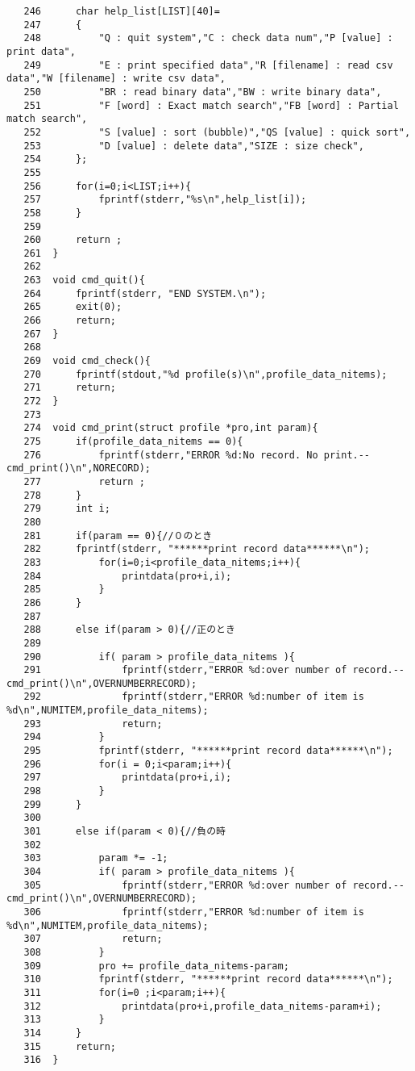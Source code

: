 \documentclass[a4j,11pt]{jarticle}
\begin{document}
{\begin{verbatim}
   246	    char help_list[LIST][40]=
   247	    {
   248	        "Q : quit system","C : check data num","P [value] : print data",
   249	        "E : print specified data","R [filename] : read csv data","W [filename] : write csv data",
   250	        "BR : read binary data","BW : write binary data",
   251	        "F [word] : Exact match search","FB [word] : Partial match search",
   252	        "S [value] : sort (bubble)","QS [value] : quick sort",
   253	        "D [value] : delete data","SIZE : size check",
   254	    };
   255	
   256	    for(i=0;i<LIST;i++){
   257	        fprintf(stderr,"%s\n",help_list[i]);
   258	    }
   259	
   260	    return ;
   261	}
   262	
   263	void cmd_quit(){
   264	    fprintf(stderr, "END SYSTEM.\n");
   265	    exit(0);
   266	    return;
   267	}
   268	
   269	void cmd_check(){
   270	    fprintf(stdout,"%d profile(s)\n",profile_data_nitems);
   271	    return;
   272	}
   273	
   274	void cmd_print(struct profile *pro,int param){
   275	    if(profile_data_nitems == 0){
   276	        fprintf(stderr,"ERROR %d:No record. No print.--cmd_print()\n",NORECORD);
   277	        return ;
   278	    }
   279	    int i;
   280	    
   281	    if(param == 0){//０のとき
   282	    fprintf(stderr, "******print record data******\n");
   283	        for(i=0;i<profile_data_nitems;i++){
   284	            printdata(pro+i,i);
   285	        }
   286	    }
   287	    
   288	    else if(param > 0){//正のとき
   289	        
   290	        if( param > profile_data_nitems ){
   291	            fprintf(stderr,"ERROR %d:over number of record.--cmd_print()\n",OVERNUMBERRECORD);
   292	            fprintf(stderr,"ERROR %d:number of item is %d\n",NUMITEM,profile_data_nitems);
   293	            return;
   294	        }
   295	        fprintf(stderr, "******print record data******\n");
   296	        for(i = 0;i<param;i++){
   297	            printdata(pro+i,i);
   298	        }
   299	    }
   300	    
   301	    else if(param < 0){//負の時
   302	        
   303	        param *= -1;
   304	        if( param > profile_data_nitems ){
   305	            fprintf(stderr,"ERROR %d:over number of record.--cmd_print()\n",OVERNUMBERRECORD);
   306	            fprintf(stderr,"ERROR %d:number of item is %d\n",NUMITEM,profile_data_nitems);
   307	            return;
   308	        }
   309	        pro += profile_data_nitems-param;
   310	        fprintf(stderr, "******print record data******\n");
   311	        for(i=0 ;i<param;i++){
   312	            printdata(pro+i,profile_data_nitems-param+i);
   313	        }
   314	    }
   315	    return;
   316	}

\end{verbatim}}
\end{document}
